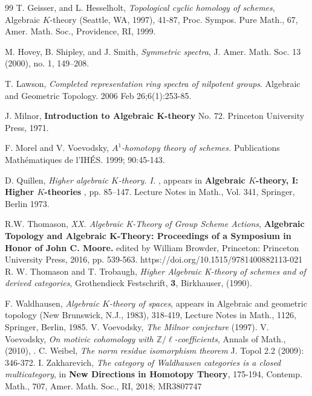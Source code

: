 \documentclass[11pt]{article}
\begin{document}
\begin{thebibliography}{99}
 T. Geisser,  and  L. Hesselholt,  {\em Topological cyclic homology of schemes},  Algebraic $K$-theory (Seattle, WA, 1997),  41-87, Proc. Sympos. Pure Math., 67, Amer. Math. Soc., Providence, RI, 1999.

 M. Hovey, B. Shipley,  and J. Smith, {\em Symmetric spectra},   J. Amer. Math. Soc.  13  (2000),  no. 1, 149--208. 

 T. Lawson,  {\em Completed representation ring spectra of nilpotent groups}. Algebraic and Geometric Topology. 2006 Feb 26;6(1):253-85.

     J. Milnor, {\bf Introduction to Algebraic K-theory} No. 72. Princeton University Press, 1971.
   
     F. Morel and V. Voevodsky,  {\em $ A^ 1$-homotopy theory of schemes.} Publications Mathématiques de l'IH\'{E}S. 1999; 90:45-143.
	
	 D. Quillen, {\em Higher algebraic $K$-theory. I.  }, appears in {\bf Algebraic $K$-theory, I: Higher $K$-theories },  pp. 85--147. Lecture Notes in Math., Vol. 341, Springer, Berlin 1973.
   
     R.W. Thomason, {\em XX. Algebraic K-Theory of Group Scheme Actions},  {\bf Algebraic Topology and Algebraic K-Theory: Proceedings of a Symposium in Honor of John C. Moore.} edited by William Browder, Princeton: Princeton University Press, 2016, pp. 539-563. https://doi.org/10.1515/9781400882113-021
    R. W. Thomason and T. Trobaugh, {\em Higher Algebraic K-theory of schemes and of derived categories}, Grothendieck Festschrift, \textbf{3}, Birkhauser, (1990).
    
	F. Waldhausen, {\em Algebraic $K$-theory of spaces}, appears in   Algebraic and geometric topology (New Brunswick, N.J., 1983),  318-419, Lecture Notes in Math., 1126, Springer, Berlin, 1985.
V. Voevodsky, {\em The Milnor conjecture} (1997).
 V. Voevodsky, {\em On motivic cohomology with ${\mathbb Z}/\ell$-coefficients},
Annals of Math., (2010),  .
 C. Weibel,  {\em The norm residue isomorphism theorem} J. Topol 2.2 (2009): 346-372.
 I. Zakharevich, {\em The category of Waldhausen categories is a closed multicategory}, in {\bf New Directions in Homotopy Theory}, 175-194, Contemp. Math., 707, Amer. Math. Soc., RI, 2018; MR3807747
\end{thebibliography}


 
\end{document}
